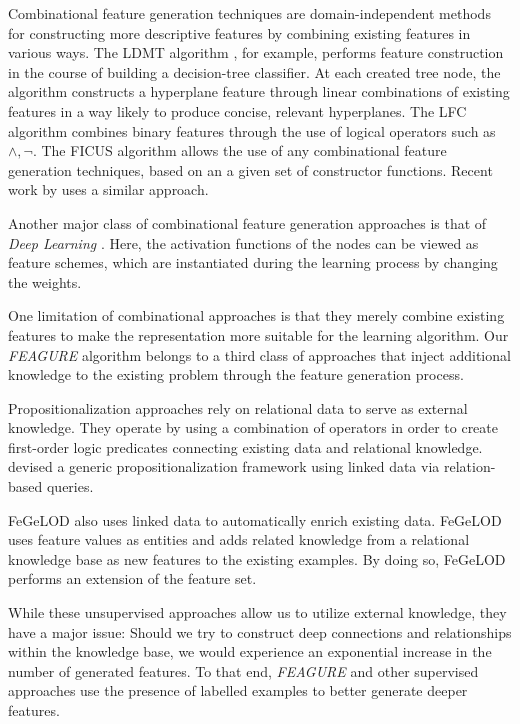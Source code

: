 \documentclass[twoside,11pt]{article}
\theoremstyle{definition}
\begin{document}
Combinational feature generation techniques are domain-independent methods for constructing more descriptive features by combining existing features in various ways. The LDMT algorithm \cite{utgo1991linear}, for example, performs feature construction in the course of building a decision-tree classifier. At each created tree node, the algorithm constructs a hyperplane feature through linear combinations of existing features in a way likely to produce concise, relevant hyperplanes. The LFC algorithm \cite{ragavan1993complex} combines binary features through the use of logical operators such as $\land ,\lnot$.
The FICUS algorithm \cite{markovitch2002feature} allows the use of any combinational feature generation techniques, based on an a given set of constructor functions. Recent work by  uses a similar approach.

Another major class of combinational feature generation approaches is that of \emph{Deep Learning} . Here, the  activation functions of the nodes can be viewed as feature schemes, which are instantiated during the learning process by changing the weights.

One limitation of combinational approaches is that they merely combine existing features to make the representation more suitable for the 
learning algorithm. 
Our \emph{FEAGURE} algorithm belongs to a third class of approaches that inject additional knowledge to the existing problem through the feature generation process.
	
	 Propositionalization approaches \cite{kramer2000bottom,cheng2011automatedfull} rely on relational data to serve as external knowledge. They operate by using a combination of operators in order to create first-order logic predicates connecting existing data and relational knowledge. 
	 devised a generic propositionalization framework  using linked data via relation-based queries. 
	
	 FeGeLOD \cite{paulheim2012unsupervisedfull} also uses linked data to automatically enrich existing data. 
	FeGeLOD uses feature values as entities and adds related knowledge from a relational knowledge base as new features to the existing examples. By doing so, FeGeLOD performs an extension of the feature set.
	
	While these unsupervised approaches allow us to utilize external knowledge, they have a major issue: Should we try to construct deep connections and relationships within the knowledge base, we would experience an exponential increase in the number of generated features.
	To that end, \emph{FEAGURE} and other supervised approaches use the presence of labelled examples to better generate deeper features.
	
\end{document}
